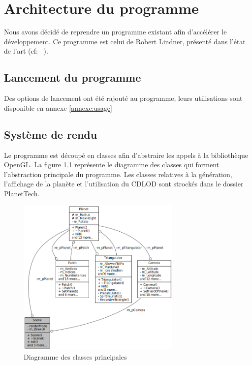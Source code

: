   	
  \chapter{Architecture du programme}
  
  Nous avons décidé de reprendre un programme existant afin d'accélérer le développement.
  Ce programme est celui de Robert Lindner, présenté dans l'état de l'art (cf: ~).
  
  \section{Lancement du programme}
  Des options de lancement ont été rajouté au programme, leurs utilisations sont disponible en annexe \ref{annexe:usage}
  

  \section{Système de rendu}
  Le programme est découpé en classes afin d'abstraire les appels à la bibliothèque OpenGL. La figure \ref{fig:uml_scene} représente le diagramme des classes qui forment l'abstraction principale du programme.
  Les classes relatives à la génération, l'affichage de la planète et l'utilisation du CDLOD sont strockés dans le dossier
  PlanetTech.
  
  \begin{figure}[!ht]
  \centering
  \includegraphics[width=8cm]{img/uml_scene.png}
  \caption{Diagramme des classes principales}
  \label{fig:uml_scene}
  \end{figure}

